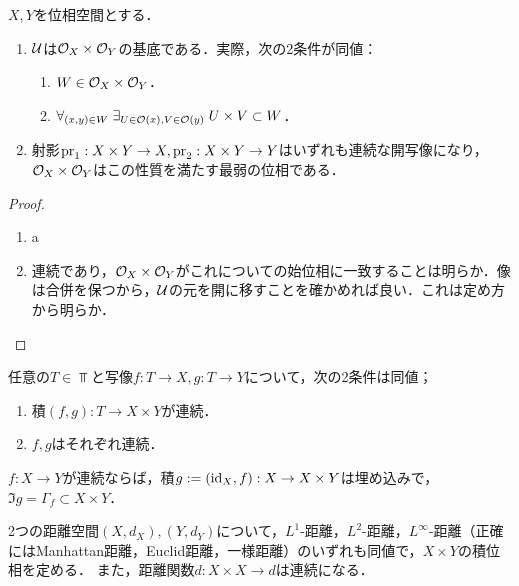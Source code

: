 \documentclass[uplatex,dvipdfmx]{jsreport}
\begin{document}
\begin{proposition}[積位相の特徴付け]
    $X,Y$を位相空間とする．
    \begin{enumerate}
        \item $\mathcal{U}$は$\mathcal{O}_X\times\mathcal{O}_Y$の基底である．実際，次の2条件が同値：
        \begin{enumerate}
            \item $W\in\mathcal{O}_X\times\mathcal{O}_Y$．
            \item $\forall_{(x,y)\in W}\;\exists_{U\in\mathcal{O}(x),V\in\mathcal{O}(y)}\;U\times V\subset W$．
        \end{enumerate}
        \item 射影$\mathrm{pr}_1:X\times Y\to X,\mathrm{pr}_2:X\times Y\to Y$はいずれも連続な開写像になり，$\mathcal{O}_X\times\mathcal{O}_Y$はこの性質を満たす最弱の位相である．
    \end{enumerate}
\end{proposition}
\begin{proof}\mbox{}
    \begin{enumerate}
        \item a
        \item 連続であり，$\mathcal{O}_X\times\mathcal{O}_Y$がこれについての始位相に一致することは明らか．像は合併を保つから，$\mathcal{U}$の元を開に移すことを確かめれば良い．これは定め方から明らか．
    \end{enumerate}
\end{proof}

\begin{proposition}[積写像の連続性の特徴付け]
    任意の$T\in\Top$と写像$f:T\to X,g:T\to Y$について，次の2条件は同値；
    \begin{enumerate}
        \item 積$(f,g):T\to X\times Y$が連続．
        \item $f,g$はそれぞれ連続．
    \end{enumerate}
\end{proposition}

\begin{proposition}[連続写像のグラフの埋め込み]
    $f:X\to Y$が連続ならば，積$g:=(\mathrm{id}_X,f):X\to X\times Y$は埋め込みで，$\Im g=\Gamma_f\subset X\times Y$．
\end{proposition}

\begin{example}[距離空間の積]
    2つの距離空間$(X,d_X),(Y,d_Y)$について，$L^1$-距離，$L^2$-距離，$L^\infty$-距離（正確にはManhattan距離，Euclid距離，一様距離）のいずれも同値で，$X\times Y$の積位相を定める．
    また，距離関数$d:X\times X\to d$は連続になる．
\end{example}
\end{document}
